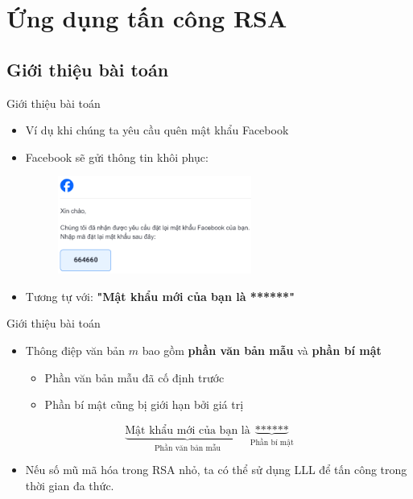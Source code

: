\section{Ứng dụng tấn công RSA}

\subsection{Giới thiệu bài toán}

\begin{frame}{Giới thiệu bài toán}

\begin{itemize}
\item Ví dụ khi chúng ta yêu cầu quên mật khẩu Facebook
\item Facebook sẽ gửi thông tin khôi phục:

\begin{figure}[h]
\includegraphics[width=0.6\textwidth]{pictures/facebook.png}
\end{figure}

\item Tương tự với: \textbf{"Mật khẩu mới của bạn là ******"}
\end{itemize}

\end{frame}
\begin{frame}{Giới thiệu bài toán}

\begin{itemize}
\item Thông điệp văn bản \(m \) bao gồm \textbf{phần văn bản mẫu} và \textbf{phần bí mật}

\begin{itemize}
\item Phần văn bản mẫu đã cố định trước
\item Phần bí mật cũng bị giới hạn bởi giá trị
\end{itemize}

\end{itemize}

$$
\underbrace{\text{Mật khẩu mới của bạn là}}_{\text{Phần văn bản mẫu}}
\underbrace{\text{******}}_{\text{Phần bí mật}}
$$

\begin{itemize}
\item Nếu số mũ mã hóa trong RSA nhỏ, ta có thể sử dụng LLL để tấn công trong thời gian đa thức.
\end{itemize}

\end{frame}
